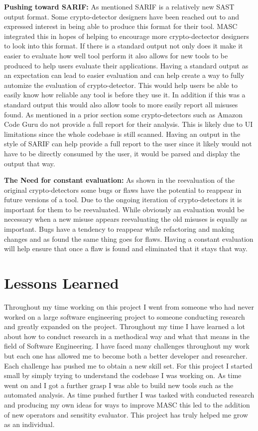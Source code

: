 \textbf{Pushing toward SARIF:}
As mentioned SARIF is a relatively new SAST output format. Some crypto-detector designers have been reached out to and expressed interest in being able to produce this format for their tool. MASC integrated this in hopes of helping to encourage more crypto-dectector designers to look into this format. If there is a standard output not only does it make it easier to evaluate how well tool perform it also allows for new tools to be produced to help users evaluate their applications. Having a standard output as an expectation can lead to easier evaluation and can help create a way to fully automize the evaluation of crypto-detector. This would help users be able to easily know how reliable any tool is before they use it. In addition if this was a standard output this would also allow tools to more easily report all misuses found. As mentioned in a prior section some crypto-detectors such as Amazon Code Guru do not provide a full report for their analysis. This is likely due to UI limitations since the whole codebase is still scanned. Having an output in the style of SARIF can help provide a full report to the user since it likely would not have to be directly consumed by the user, it would be parsed and display the output that way. 

\textbf{The Need for constant evaluation:}
As shown in the reevaluation of the original crypto-detectors some bugs or flaws have the potential to reappear in future versions of a tool. Due to the ongoing iteration of crypto-detectors it is important for them to be reevaluated. While obviously an evaluation would be necessary when a new misuse appears reevaluating the old misuses is equally as important. Bugs have a tendency to reappear while refactoring and making changes and as found the same thing goes for flaws. Having a constant evaluation will help ensure that once a flaw is found and eliminated that it stays that way.


\section{Lessons Learned}
\label{ch6:sec:lessons}

Throughout my time working on this project I went from someone who had never worked on a large software engineering project to someone conducting research and greatly expanded on the project. Throughout my time I have learned a lot about how to conduct research in a methodical way and what that means in the field of Software Engineering. I have faced many challenges throughout my work but each one has allowed me to become both a better developer and researcher. Each challenge has pushed me to obtain a new skill set. For this project I started small by simply trying to understand the codebase I was working on. As time went on and I got a further grasp I was able to build new tools such as the automated analysis. As time pushed further I was tasked with conducted research and producing my own ideas for ways to improve MASC this led to the addition of new operators and sensitity evaluator. This project has truly helped me grow as an individual.

